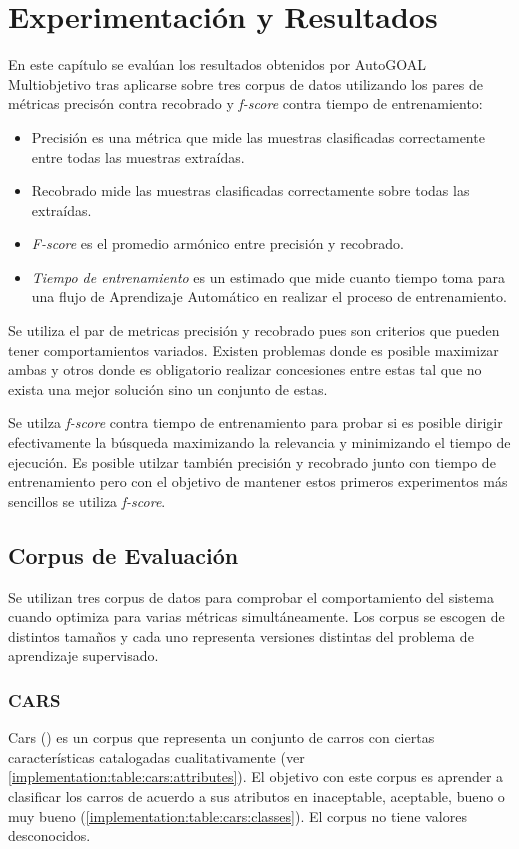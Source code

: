 \chapter{Experimentaci\'on y Resultados}\label{chapter:experiments}
En este cap\'itulo se eval\'uan los resultados obtenidos por AutoGOAL Multiobjetivo tras aplicarse sobre tres corpus de datos utilizando los pares de m\'etricas precis\'on contra recobrado y \textit{f-score} contra tiempo de entrenamiento:
\begin{itemize}
    \item Precisi\'on es una m\'etrica que mide las muestras clasificadas correctamente entre todas las muestras extra\'idas.
    \item Recobrado mide las muestras clasificadas correctamente sobre todas las extra\'idas.
    \item \textit{F-score} es el promedio arm\'onico entre precisi\'on y recobrado.
    \item \textit{Tiempo de entrenamiento} es un estimado que mide cuanto tiempo toma para una flujo de Aprendizaje Autom\'atico en realizar el proceso de entrenamiento.
\end{itemize}

Se utiliza el par de metricas precisi\'on y recobrado pues son criterios que pueden tener comportamientos variados. Existen problemas donde es posible maximizar ambas y otros donde es obligatorio realizar concesiones entre estas tal que no exista una mejor soluci\'on sino un conjunto de estas.

Se utilza \textit{f-score} contra tiempo de entrenamiento para probar si es posible dirigir efectivamente  la b\'usqueda maximizando la relevancia y minimizando el tiempo de ejecuci\'on. Es posible utilzar tambi\'en precisi\'on y recobrado junto con tiempo de entrenamiento pero con el objetivo de mantener estos primeros experimentos m\'as sencillos se utiliza \textit{f-score}.

\section{Corpus de Evaluaci\'on}
Se utilizan tres corpus de datos para comprobar el comportamiento del sistema cuando optimiza para varias m\'etricas simult\'aneamente. Los corpus se escogen de distintos tamaños y cada uno representa versiones distintas del problema de aprendizaje supervisado.

\subsection{CARS}
Cars (\cite{Dua:2019}) es un corpus que representa un conjunto de carros con ciertas caracter\'isticas catalogadas cualitativamente (ver \ref{implementation:table:cars:attributes}). El objetivo con este corpus es aprender a clasificar los carros de  acuerdo a sus atributos  en inaceptable, aceptable, bueno o muy bueno (\ref{implementation:table:cars:classes}). El corpus no tiene valores desconocidos.

